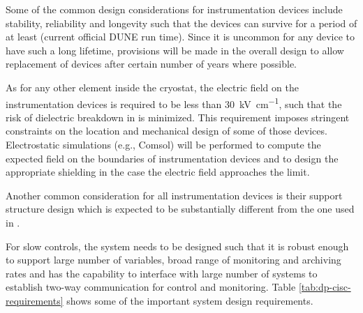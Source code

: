 Some of the common design considerations for
instrumentation devices include stability, reliability and longevity
such that the devices can survive for a period of at least \dunelifetime
(current official DUNE run time).  Since it is uncommon for any device
to have such a long lifetime, provisions will be made in the overall
design to allow replacement of devices after certain number of
years where possible.

As for any other element inside the cryostat, 
the electric field on the instrumentation devices is 
required to be less than \SI{30}{kV\per\cm},
such that the risk of dielectric breakdown in  is minimized.
This requirement imposes stringent constraints on the location and mechanical 
design of some of those devices. Electrostatic simulations (e.g., Comsol) 
will be performed to compute the expected field on the boundaries of 
instrumentation devices and to design the appropriate \efield shielding
in the case the electric field approaches the limit. 

Another common consideration for all instrumentation devices is their support structure
design which is expected to be substantially different from the one used in .

For slow controls, the system needs to be designed such that it is
robust enough to support large number of variables, broad range of
monitoring and archiving rates and has the capability to interface
with large number of systems to establish two-way communication for
control and monitoring. Table \ref{tab:dp-cisc-requirements} shows
some of the important  system design requirements.




